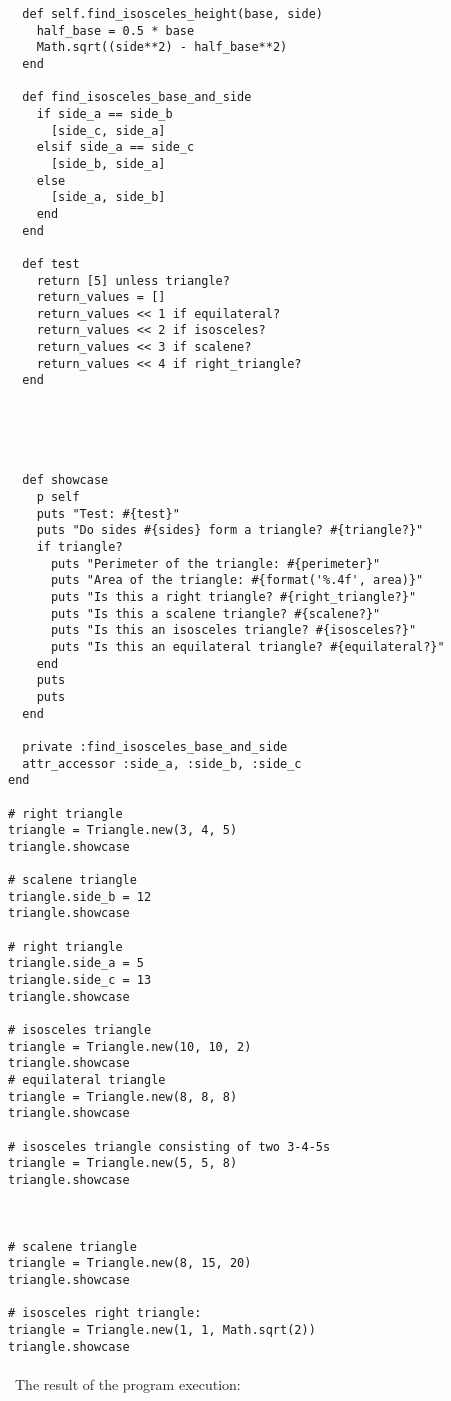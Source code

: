 \documentclass{article}
\begin{document}
\begin{verbatim}
  def self.find_isosceles_height(base, side)
    half_base = 0.5 * base
    Math.sqrt((side**2) - half_base**2)
  end

  def find_isosceles_base_and_side
    if side_a == side_b
      [side_c, side_a]
    elsif side_a == side_c
      [side_b, side_a]
    else
      [side_a, side_b]
    end
  end

  def test
    return [5] unless triangle?
    return_values = []
    return_values << 1 if equilateral?
    return_values << 2 if isosceles?
    return_values << 3 if scalene?
    return_values << 4 if right_triangle?
  end





  def showcase
    p self
    puts "Test: #{test}"
    puts "Do sides #{sides} form a triangle? #{triangle?}"
    if triangle?
      puts "Perimeter of the triangle: #{perimeter}"
      puts "Area of the triangle: #{format('%.4f', area)}"
      puts "Is this a right triangle? #{right_triangle?}"
      puts "Is this a scalene triangle? #{scalene?}"
      puts "Is this an isosceles triangle? #{isosceles?}"
      puts "Is this an equilateral triangle? #{equilateral?}"
    end
    puts
    puts
  end

  private :find_isosceles_base_and_side
  attr_accessor :side_a, :side_b, :side_c
end

# right triangle
triangle = Triangle.new(3, 4, 5)
triangle.showcase

# scalene triangle
triangle.side_b = 12
triangle.showcase

# right triangle
triangle.side_a = 5
triangle.side_c = 13
triangle.showcase

# isosceles triangle
triangle = Triangle.new(10, 10, 2)
triangle.showcase
# equilateral triangle
triangle = Triangle.new(8, 8, 8)
triangle.showcase

# isosceles triangle consisting of two 3-4-5s
triangle = Triangle.new(5, 5, 8)
triangle.showcase



# scalene triangle
triangle = Triangle.new(8, 15, 20)
triangle.showcase

# isosceles right triangle:
triangle = Triangle.new(1, 1, Math.sqrt(2))
triangle.showcase
\end{verbatim}

\paragraph{}\
	The result of the program execution:
	
\end{document}
